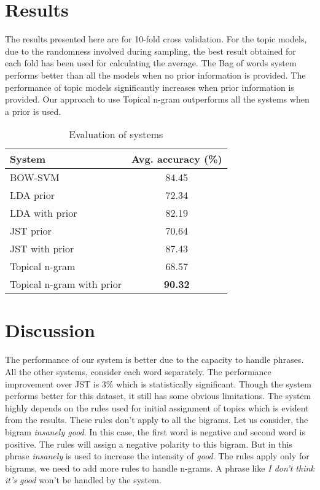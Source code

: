 \documentclass[11pt]{article}
\begin{document}
\section{Results}\label{results}

The results presented here are for 10-fold cross validation. For the topic models, due to the randomness involved 
during sampling, the best result obtained for each fold has been used for calculating the average. The Bag of words 
system performs better than all the models when no prior information is provided. The performance of topic models 
significantly increases when prior information is provided. Our approach to use Topical n-gram outperforms all the 
systems when a prior is used.

\begin{table}[h]
\begin{center}
\begin{tabular}{|l|c|}
\hline \bf System & \bf Avg. accuracy (\%)\\ \hline
BOW-SVM & 84.45\\
LDA prior & 72.34\\
LDA with prior & 82.19\\
JST prior & 70.64\\
JST with prior & 87.43\\
Topical n-gram & 68.57\\
Topical n-gram with prior & \textbf{90.32}\\
\hline
\end{tabular}
\end{center}
\caption{\label{result-table} Evaluation of systems}
\end{table}

\section{Discussion}\label{discussion}

The performance of our system is better due to the capacity to handle phrases. All the other systems, consider each word
separately. The performance improvement over JST is 3\% which is statistically significant. Though the system performs
better for this dataset, it still has some obvious limitations. The system highly depends on the rules used for
initial assignment of topics which is evident from the results. These rules don't apply to all the bigrams. Let us
consider, the bigram \textit{insanely good}. In this case, the first word is negative and second word is positive. The rules
will assign a negative polarity to this bigram. But in this phrase \textit{insanely} is used to increase the intensity of 
\textit{good}. The rules apply only for bigrams, we need to add more rules to handle n-grams. A phrase like \textit{I don't
think it's good} won't be handled by the system.
\end{document}
